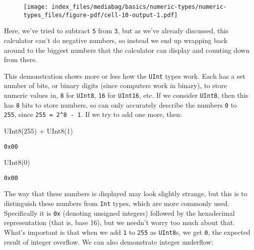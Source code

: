\documentclass[
  letterpaper,
  DIV=11,
  numbers=noendperiod]{scrreprt}
\newenvironment{Shaded}{\begin{snugshade}}{\end{snugshade}}
\newcommand{\FloatTok}[1]{\textcolor[rgb]{0.68,0.00,0.00}{#1}}
\newcommand{\FunctionTok}[1]{\textcolor[rgb]{0.28,0.35,0.67}{#1}}
\newcommand{\NormalTok}[1]{\textcolor[rgb]{0.00,0.23,0.31}{#1}}
\newcommand{\OperatorTok}[1]{\textcolor[rgb]{0.37,0.37,0.37}{#1}}
\begin{document}
\begin{figure}[H]

{\centering \texttt{[image: index\_files/mediabag/basics/numeric-types/numeric-types\_files/figure-pdf/cell-10-output-1.pdf]}

}

\end{figure}

Here, we've tried to subtract \texttt{5} from \texttt{3}, but as we've
already discussed, this calculator can't do negative numbers, so instead
we end up wrapping back around to the biggest numbers that the
calculator can display and counting down from there.

This demonstration shows more or less how the \texttt{UInt} types work.
Each has a set number of bits, or binary digits (since computers work in
binary), to store numeric values in, \texttt{8} for \texttt{UInt8},
\texttt{16} for \texttt{UInt16}, etc. If we consider \texttt{UInt8},
then this has \texttt{8} bits to store numbers, so can only accurately
describe the numbers \texttt{0} to \texttt{255}, since
\texttt{255\ =\ 2\^{}8\ -\ 1}. If we try to add one more, then:

\begin{Shaded}
\begin{Highlighting}[]
\FunctionTok{UInt8}\NormalTok{(}\FloatTok{255}\NormalTok{) }\OperatorTok{+} \FunctionTok{UInt8}\NormalTok{(}\FloatTok{1}\NormalTok{)}
\end{Highlighting}
\end{Shaded}

\begin{verbatim}
0x00
\end{verbatim}

\begin{Shaded}
\begin{Highlighting}[]
\FunctionTok{UInt8}\NormalTok{(}\FloatTok{0}\NormalTok{)}
\end{Highlighting}
\end{Shaded}

\begin{verbatim}
0x00
\end{verbatim}

The way that these numbers is displayed may look slightly strange, but
this is to distinguish these numbers from \texttt{Int} types, which are
more commonly used. Specifically it is \texttt{0x} (denoting unsigned
integers) followed by the hexadecimal representation (that is, base 16),
but we needn't worry too much about that. What's important is that when
we add \texttt{1} to \texttt{255} as \texttt{UInt8}s, we get \texttt{0},
the expected result of integer overflow. We can also demonstrate integer
underflow:
\end{document}
